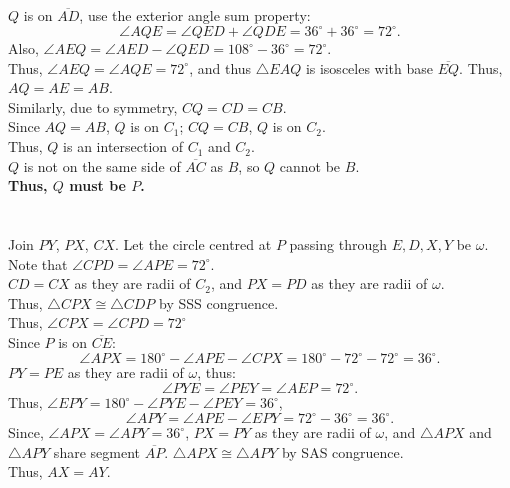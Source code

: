 \documentclass{article}
\begin{document}

$Q$ is on $\overline{AD}$, use the exterior angle sum property:
$$\angle AQE = \angle QED + \angle QDE = 36^\circ + 36^\circ = 72^\circ.$$
Also, $\angle AEQ = \angle AED - \angle QED = 108^\circ - 36^\circ = 72^\circ$. \\
Thus, $\angle AEQ = \angle AQE = 72^\circ$, and thus $\triangle EAQ$ is isosceles with base $\overline{EQ}$.
Thus, $AQ = AE = AB$. \\
Similarly, due to symmetry, $CQ = CD = CB$. \\
Since $AQ = AB$, $Q$ is on $C_1$; $CQ = CB$, $Q$ is on $C_2$. \\
Thus, $Q$ is an intersection of $C_1$ and $C_2$. \\
$Q$ is not on the same side of $\overline{AC}$ as $B$, so $Q$ cannot be $B$. \\
\textbf{Thus, $Q$ must be $P$.} \\ \\ \\

\newpage
Join $PY$, $PX$, $CX$. Let the circle centred at $P$ passing through $E,D,X,Y$ be $\omega$.\\

Note that $\angle CPD = \angle APE = 72^\circ$. \\
$CD = CX$ as they are radii of $C_2$, and $PX = PD$ as they are radii of $\omega$. \\
Thus, $\triangle CPX \cong \triangle CDP$ by SSS congruence. \\
Thus, $\angle CPX = \angle CPD = 72^\circ$ \\
Since $P$ is on $\overline{CE}$:
$$\angle APX = 180^\circ - \angle APE - \angle CPX = 180^\circ - 72^\circ - 72^\circ = 36^\circ.$$
$PY = PE$ as they are radii of $\omega$, thus:
$$\angle PYE = \angle PEY = \angle AEP = 72^\circ.$$
Thus, $\angle EPY = 180^\circ - \angle PYE - \angle PEY = 36^\circ$,
$$\angle APY = \angle APE - \angle EPY = 72^\circ - 36^\circ = 36^\circ.$$
Since, $\angle APX = \angle APY = 36^\circ$, $PX = PY$ as they are radii of $\omega$, and $\triangle APX$ and $\triangle APY$ share segment $\overline{AP}$. $\triangle APX \cong \triangle APY$ by SAS congruence. \\
Thus, $AX = AY$.
\end{document}
